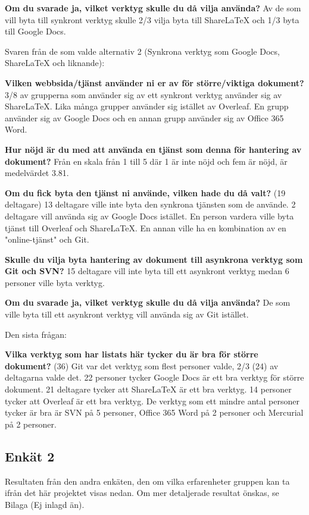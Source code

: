 \textbf{Om du svarade ja, vilket verktyg skulle du då vilja använda?}
Av de som vill byta till synkront verktyg skulle 2/3 vilja byta till ShareLaTeX och 1/3 byta till Google Docs.


Svaren från de som valde alternativ 2 (Synkrona verktyg som Google Docs, ShareLaTeX och liknande):

\textbf{Vilken webbsida/tjänst använder ni er av för större/viktiga dokument?}
3/8 av grupperna som använder sig av ett synkront verktyg använder sig av ShareLaTeX. Lika många grupper använder sig istället av Overleaf. En grupp använder sig av Google Docs och en annan grupp använder sig av Office 365 Word. 


\textbf{Hur nöjd är du med att använda en tjänst som denna för hantering av dokument?}
Från en skala från 1 till 5 där 1 är inte nöjd och fem är nöjd, är medelvärdet 3.81.

\textbf{Om du fick byta den tjänst ni använde, vilken hade du då valt?} (19 deltagare)
13 deltagare ville inte byta den synkrona tjänsten som de använde. 2 deltagare vill använda sig av Google Docs istället. En person vardera ville byta tjänst till Overleaf och ShareLaTeX. En annan ville ha en kombination av en "online-tjänst" och Git.

\textbf{Skulle du vilja byta hantering av dokument till asynkrona verktyg som Git och SVN?}
15 deltagare vill inte byta till ett asynkront verktyg medan 6 personer ville byta verktyg.

\textbf{Om du svarade ja, vilket verktyg skulle du då vilja använda?}
De som ville byta till ett asynkront verktyg vill använda sig av Git istället.

Den sista frågan:

\textbf{Vilka verktyg som har listats här tycker du är bra för större dokument?} (36)
Git var det verktyg som flest personer valde, 2/3 (24) av deltagarna valde det. 22 personer tycker Google Docs är ett bra verktyg för större dokument. 21 deltagare tycker att ShareLaTeX är ett bra verktyg. 14 personer tycker att Overleaf är ett bra verktyg. De verktyg som ett mindre antal personer tycker är bra är SVN på 5 personer, Office 365 Word på 2 personer och Mercurial på 2 personer.

\subsection{Enkät 2}
Resultaten från den andra enkäten, den om vilka erfarenheter gruppen kan ta ifrån det här projektet visas nedan. Om mer detaljerade resultat önskas, se Bilaga (Ej inlagd än).

